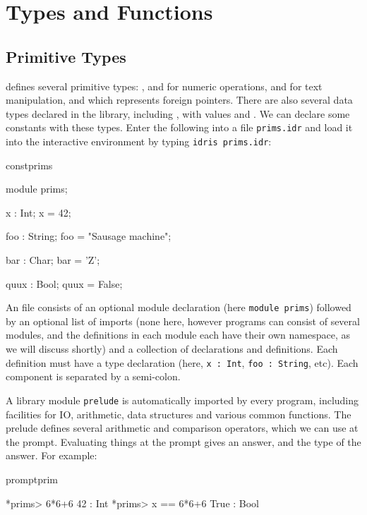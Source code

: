 \section{Types and Functions}

\subsection{Primitive Types}

\Idris{} defines several primitive types: ,  and
 for numeric operations,  and  for
text manipulation, and  which represents foreign pointers.
There are also several data types declared in the library, including
, with values  and .
We can declare some constants with these types. Enter the following
into a file \texttt{prims.idr} and load it into the \Idris{} interactive
environment by typing \texttt{idris prims.idr}:

\begin{SaveVerbatim}{constprims}

module prims;

x : Int;
x = 42;

foo : String;
foo = "Sausage machine";

bar : Char;
bar = 'Z';

quux : Bool;
quux = False;

\end{SaveVerbatim}

An \Idris{} file consists of an optional module declaration (here
\texttt{module prims}) followed by an optional list of imports (none here,
however \Idris{} programs can consist of several modules, and the definitions
in each module each have their own namespace, as we will discuss shortly) and a
collection of declarations and definitions. Each definition must have a type
declaration (here, \texttt{x : Int}, \texttt{foo : String}, etc).  Each
component is separated by a semi-colon.

A library module \texttt{prelude} is automatically imported by every \Idris{} program,
including facilities for IO, arithmetic, data structures and various common
functions. The prelude defines several arithmetic and comparison operators,
which we can use at the prompt. Evaluating things at the prompt gives an
answer, and the type of the answer. For example:

\begin{SaveVerbatim}{promptprim}

*prims> 6*6+6
42 : Int
*prims> x == 6*6+6
True : Bool

\end{SaveVerbatim}

